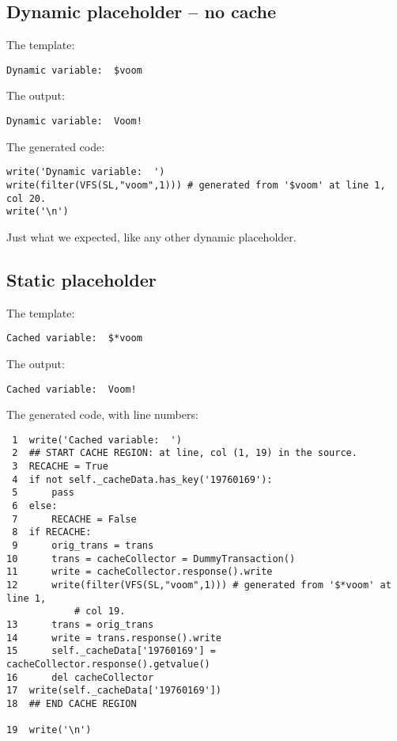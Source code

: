 \subsection{Dynamic placeholder -- no cache}
\label{output.cache.dynamic}

The template:
\begin{verbatim}
Dynamic variable:  $voom
\end{verbatim}

The output:
\begin{verbatim}
Dynamic variable:  Voom!
\end{verbatim}

The generated code:
\begin{verbatim}
write('Dynamic variable:  ')
write(filter(VFS(SL,"voom",1))) # generated from '$voom' at line 1, col 20.
write('\n')
\end{verbatim}

Just what we expected, like any other dynamic placeholder.

\subsection{Static placeholder}
\label{output.cache.static}

The template:
\begin{verbatim}
Cached variable:  $*voom
\end{verbatim}

The output:
\begin{verbatim}
Cached variable:  Voom!
\end{verbatim}

The generated code, with line numbers:
\begin{verbatim}
 1  write('Cached variable:  ')
 2  ## START CACHE REGION: at line, col (1, 19) in the source.
 3  RECACHE = True
 4  if not self._cacheData.has_key('19760169'):
 5      pass
 6  else:
 7      RECACHE = False
 8  if RECACHE:
 9      orig_trans = trans
10      trans = cacheCollector = DummyTransaction()
11      write = cacheCollector.response().write
12      write(filter(VFS(SL,"voom",1))) # generated from '$*voom' at line 1,
            # col 19.
13      trans = orig_trans
14      write = trans.response().write
15      self._cacheData['19760169'] = cacheCollector.response().getvalue()
16      del cacheCollector
17  write(self._cacheData['19760169'])
18  ## END CACHE REGION
    
19  write('\n')
\end{verbatim}

